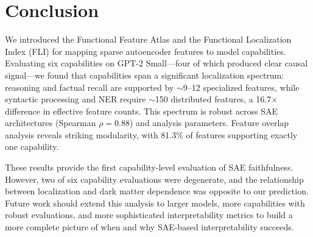 \documentclass{article}
\begin{document}
\section{Conclusion}
\label{sec:conclusion}

We introduced the Functional Feature Atlas and the Functional Localization Index (FLI) for mapping sparse autoencoder features to model capabilities. Evaluating six capabilities on GPT-2 Small---four of which produced clear causal signal---we found that capabilities span a significant localization spectrum: reasoning and factual recall are supported by $\sim$9--12 specialized features, while syntactic processing and NER require $\sim$150 distributed features, a 16.7$\times$ difference in effective feature counts. This spectrum is robust across SAE architectures (Spearman $\rho = 0.88$) and analysis parameters. Feature overlap analysis reveals striking modularity, with 81.3\% of features supporting exactly one capability.

These results provide the first capability-level evaluation of SAE faithfulness. However, two of six capability evaluations were degenerate, and the relationship between localization and dark matter dependence was opposite to our prediction. Future work should extend this analysis to larger models, more capabilities with robust evaluations, and more sophisticated interpretability metrics to build a more complete picture of when and why SAE-based interpretability succeeds.



\end{document}
